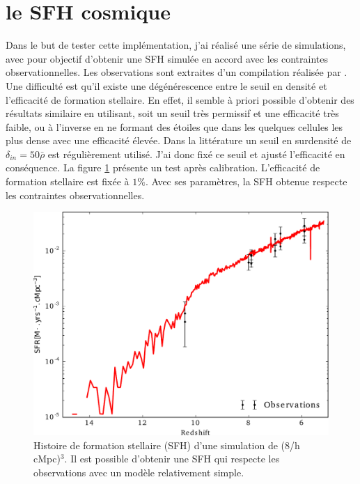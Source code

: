 \section{le SFH cosmique}

Dans le but de tester cette implémentation, j'ai réalisé une série de simulations, avec pour objectif d'obtenir une \ac{SFH} simulée en accord avec les contraintes observationnelles.
Les observations sont extraites d'un compilation réalisée par \cite{madau_cosmic_2014}.
Une difficulté est qu'il existe une dégénérescence entre le seuil en densité et l'efficacité de formation stellaire.
En effet, il semble à priori possible d'obtenir des résultats similaire en utilisant, soit un seuil très permissif et une efficacité très faible, ou à l'inverse en ne formant des étoiles que dans les quelques cellules les plus dense avec une efficacité élevée.
Dans la littérature %
un seuil en surdensité de $\delta_{in}=50\bar{\rho}$ est régulièrement utilisé.
J'ai donc fixé ce seuil et ajusté l'efficacité en conséquence.
La figure \ref{fig:test_SFH} présente un test après calibration. 
L'efficacité de formation stellaire est fixée à $1\%$.
Avec ses paramètres, la \ac{SFH} obtenue respecte les contraintes observationnelles.

\begin{figure}
        \includegraphics[width=.95\linewidth]{img/02/SFR.pdf}
        \caption{Histoire de formation stellaire (SFH) d'une simulation de (8/h cMpc)$^3$.
        Il est possible d'obtenir une SFH qui respecte les observations avec un modèle relativement simple.
}
 		\label{fig:test_SFH}
\end{figure}

